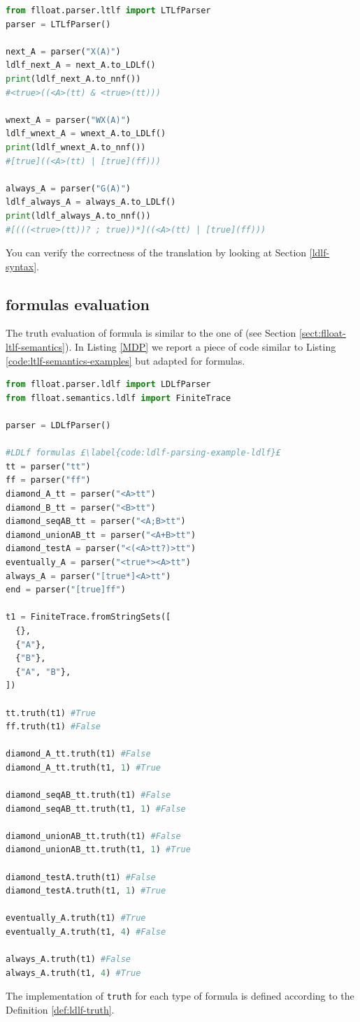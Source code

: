 \begin{lstlisting}[language=Python, style=Python, escapechar = £,  label={code:ldlf-from-to-ldlf}, caption={Specify \LDLf formulas from \LTLf formulas.}]
from flloat.parser.ltlf import LTLfParser
parser = LTLfParser()

next_A = parser("X(A)")
ldlf_next_A = next_A.to_LDLf()
print(ldlf_next_A.to_nnf()) 
#<true>((<A>(tt) & <true>(tt)))

wnext_A = parser("WX(A)")
ldlf_wnext_A = wnext_A.to_LDLf()
print(ldlf_wnext_A.to_nnf()) 
#[true]((<A>(tt) | [true](ff)))

always_A = parser("G(A)")
ldlf_always_A = always_A.to_LDLf()
print(ldlf_always_A.to_nnf()) 
#[(((<true>(tt))? ; true))*]((<A>(tt) | [true](ff)))

\end{lstlisting}
You can verify the correctness of the translation by looking at Section \ref{ldlf-syntax}.

\subsection{\LDLf formulas evaluation}
The truth evaluation of \LDLf formula is similar to the one of \LTLf (see Section \ref{sect:flloat-ltlf-semantics}). In Listing \ref{MDP} we report a piece of code similar to Listing \ref{code:ltlf-semantics-examples} but adapted for \LDLf formulas.

\begin{lstlisting}[language=Python, style=Python, escapechar = £, label={code:ldlf-semantics-example}, caption={Examples of \LDLf truth evaluations}]
from flloat.parser.ldlf import LDLfParser
from flloat.semantics.ldlf import FiniteTrace

parser = LDLfParser()

#LDLf formulas £\label{code:ldlf-parsing-example-ldlf}£
tt = parser("tt")
ff = parser("ff")
diamond_A_tt = parser("<A>tt")
diamond_B_tt = parser("<B>tt")
diamond_seqAB_tt = parser("<A;B>tt")
diamond_unionAB_tt = parser("<A+B>tt")
diamond_testA = parser("<(<A>tt?)>tt")
eventually_A = parser("<true*><A>tt")
always_A = parser("[true*]<A>tt")
end = parser("[true]ff")

t1 = FiniteTrace.fromStringSets([
  {},
  {"A"},
  {"B"},
  {"A", "B"},
])

tt.truth(t1) #True
ff.truth(t1) #False

diamond_A_tt.truth(t1) #False
diamond_A_tt.truth(t1, 1) #True

diamond_seqAB_tt.truth(t1) #False
diamond_seqAB_tt.truth(t1, 1) #False

diamond_unionAB_tt.truth(t1) #False
diamond_unionAB_tt.truth(t1, 1) #True

diamond_testA.truth(t1) #False
diamond_testA.truth(t1, 1) #True

eventually_A.truth(t1) #True
eventually_A.truth(t1, 4) #False

always_A.truth(t1) #False
always_A.truth(t1, 4) #True
\end{lstlisting}
The implementation of \texttt{truth} for each type of formula is defined according to the Definition \ref{def:ldlf-truth}.

